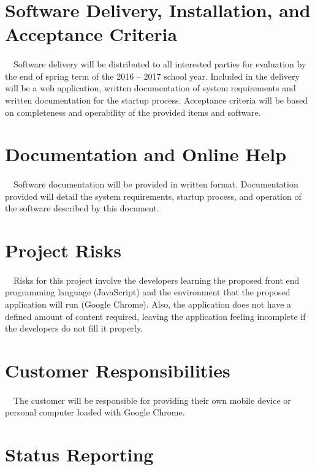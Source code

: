 \documentclass[12pt]{report}
\begin{document}
	\section{Software Delivery, Installation, and Acceptance Criteria}
		\paragraph{}\ \ Software delivery will be distributed to all interested parties for evaluation by the end of spring term of the 2016 -- 2017 school year. Included in the delivery will be a web application, written documentation of system requirements and written documentation for the startup process. Acceptance criteria will be based on completeness and operability of the provided items and software. 
	\section{Documentation and Online Help}
		\paragraph{}\ \ Software documentation will be provided in written format. Documentation provided will detail the system requirements, startup process, and operation of the software described by this document. 
	\section{Project Risks}
		\paragraph{}\ \ Risks for this project involve the developers learning the proposed front end programming language (JavaScript) and the environment that the proposed application will run (Google Chrome). Also, the application does not have a defined amount of content required, leaving the application feeling incomplete if the developers do not fill it properly.
	\section{Customer Responsibilities}
		\paragraph{}\ \ The customer will be responsible for providing their own mobile device or personal computer loaded with Google Chrome.
	\section{Status Reporting}
\end{document}
